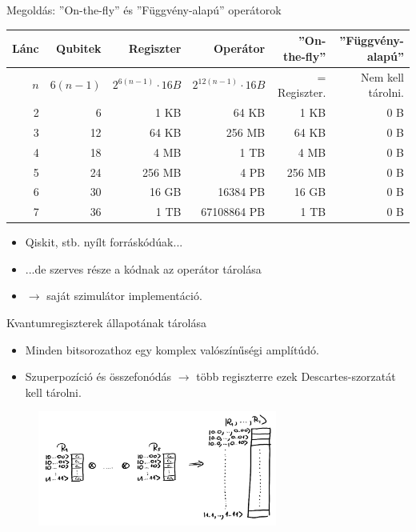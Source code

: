 \documentclass[aspectratio=169]{beamer}
\begin{document}
\begin{frame}[t]{Megoldás: ''On-the-fly'' és ''Függvény-alapú'' operátorok}
\vspace{2mm}
\begin{tabular}{r|r|r|r|r|r}
Lánc & Qubitek & Regiszter & Operátor &  \cellcolor{applegreen!30} ''On-the-fly'' &  \cellcolor{applegreen!30} ''Függvény-alapú'' \\
\hline
\rule{0pt}{1.05\normalbaselineskip} $n$ & $6(n-1)$ & $2^{6(n-1)} \cdot{} 16 B$ & ${2^{12(n-1)}} \cdot{} 16 B$ &  = Regiszter. &   Nem kell tárolni. \\
\hline
2 & 6 &  1 KB &  64 KB &  1 KB & 0 B \\
3 & 12 &  64 KB &  256 MB &  64 KB & 0 B \\
4 & 18 &  4 MB & \color{red} 1 TB &  4 MB & 0 B  \\
5 & 24 &  256 MB & \color{red} 4 PB &  256 MB & 0 B \\
6 & 30 &  16 GB & \color{red} 16384 PB &  16 GB & 0 B\\
7 & 36 & \color{red} 1 TB & \color{red} 67108864 PB & \color{red} 1 TB & 0 B
\end{tabular}
\pause
\vspace{2mm}
\begin{itemize}
    \item Qiskit, stb. nyílt forráskódúak...
    \item ...de szerves része a kódnak az operátor tárolása
    \item $\rightarrow$ saját szimulátor implementáció.
\end{itemize}

\end{frame}


\begin{frame}{Kvantumregiszterek állapotának tárolása}

\begin{itemize}
    \item Minden bitsorozathoz egy komplex valószínűségi amplítúdó.
    \item Szuperpozíció és összefonódás $\rightarrow$ több regiszterre ezek Descartes-szorzatát kell tárolni.
\end{itemize}

\begin{figure}[H]
    \centering
    \includegraphics[width=0.7\textwidth]{figures/osszefonodas.jpg}
\end{figure}

\end{frame}
\end{document}

